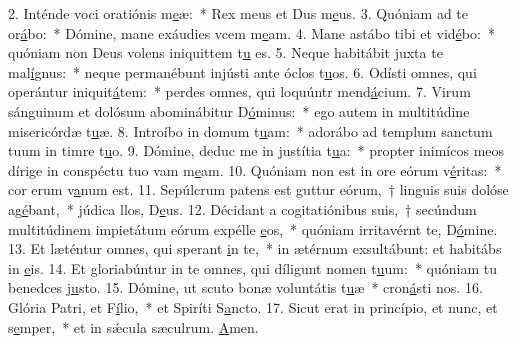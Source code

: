 2. Inténde voci oratiónis m\uline{e}æ:~* Rex meus et Dus m\uline{e}us.
3. Quóniam ad te or\uline{á}bo:~* Dómine, mane exáudies vcem m\uline{e}am.
4. Mane astábo tibi et vid\uline{é}bo:~* quóniam non Deus volens iniquittem t\uline{u} es.
5. Neque habitábit juxta te mal\uline{í}gnus:~* neque permanébunt injústi ante óclos t\uline{u}os.
6. Odísti omnes, qui operántur iniquit\uline{á}tem:~* perdes omnes, qui loquúntr mend\uline{á}cium.
7. Virum sánguinum et dolósum abominábitur D\uline{ó}minus:~* ego autem in multitúdine misericórdæ t\uline{u}æ.
8. Introíbo in domum t\uline{u}am:~* adorábo ad templum sanctum tuum in timre t\uline{u}o.
9. Dómine, deduc me in justítia t\uline{u}a:~* propter inimícos meos dírige in conspéctu tuo vam m\uline{e}am.
10. Quóniam non est in ore eórum v\uline{é}ritas:~* cor erum v\uline{a}num est.
11. Sepúlcrum patens est guttur eórum,~† linguis suis dolóse ag\uline{é}bant,~* júdica llos, D\uline{e}us.
12. Décidant a cogitatiónibus suis,~† secúndum multitúdinem impietátum eórum expélle \uline{e}os,~* quóniam irritavérnt te, D\uline{ó}mine.
13. Et læténtur omnes, qui sperant \uline{i}n te,~* in ætérnum exsultábunt: et habitábs in \uline{e}is.
14. Et gloriabúntur in te omnes, qui díligunt nomen t\uline{u}um:~* quóniam tu benedces j\uline{u}sto.
15. Dómine, ut scuto bonæ voluntátis t\uline{u}æ~* cron\uline{á}sti nos.
16. Glória Patri, et F\uline{í}lio,~* et Spiríti S\uline{a}ncto.
17. Sicut erat in princípio, et nunc, et s\uline{e}mper,~* et in sǽcula sæculrum. \uline{A}men.
